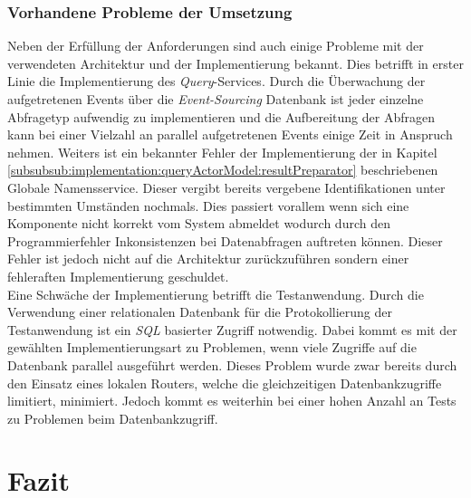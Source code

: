 \subsection{Vorhandene Probleme der Umsetzung}
Neben der Erfüllung der Anforderungen sind auch einige Probleme mit der verwendeten Architektur und der Implementierung bekannt. Dies betrifft in erster Linie die Implementierung des \textit{Query}-Services. Durch die Überwachung der aufgetretenen Events über die \textit{Event-Sourcing} Datenbank ist jeder einzelne Abfragetyp aufwendig zu implementieren und die Aufbereitung der Abfragen kann bei einer Vielzahl an parallel aufgetretenen Events einige Zeit in Anspruch nehmen. Weiters ist ein bekannter Fehler der Implementierung der in Kapitel \ref{subsubsub:implementation:queryActorModel:resultPreparator} beschriebenen Globale Namensservice. Dieser vergibt bereits vergebene Identifikationen unter bestimmten Umständen nochmals. Dies passiert vorallem wenn sich eine Komponente nicht korrekt vom System abmeldet wodurch durch den Programmierfehler Inkonsistenzen bei Datenabfragen auftreten können. Dieser Fehler ist jedoch nicht auf die Architektur zurückzuführen sondern einer fehleraften Implementierung geschuldet. \\
Eine Schwäche der Implementierung betrifft die Testanwendung. Durch die Verwendung einer relationalen Datenbank für die Protokollierung der Testanwendung ist ein \textit{SQL} basierter Zugriff notwendig. Dabei kommt es mit der gewählten Implementierungsart zu Problemen, wenn viele Zugriffe auf die Datenbank parallel ausgeführt werden. Dieses Problem wurde zwar bereits durch den Einsatz eines lokalen Routers, welche die gleichzeitigen Datenbankzugriffe limitiert, minimiert. Jedoch kommt es weiterhin bei einer hohen Anzahl an Tests zu Problemen beim Datenbankzugriff. 

\chapter{Fazit}
